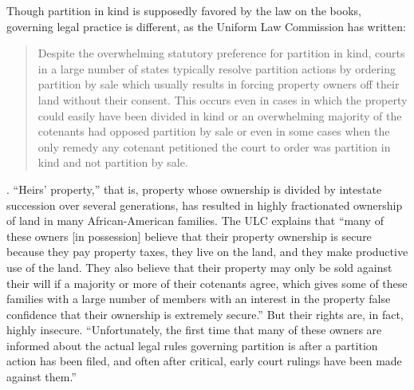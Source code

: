 
Though partition in kind is supposedly favored by the law on the books,
governing legal practice is different, as the Uniform Law Commission has
written:
\begin{quote}
Despite the overwhelming statutory preference for partition in kind, courts in a
large number of states typically resolve partition actions by ordering
partition by sale which usually results in forcing property owners off their
land without their consent. This occurs even in cases in which the property
could easily have been divided in kind or an overwhelming majority of the
cotenants had opposed partition by sale or even in some cases when the only
remedy any cotenant petitioned the court to order was partition in kind and not
partition by sale.
\end{quote}
.
``Heirs'
property,'' that is, property whose ownership is divided by intestate
succession over several generations, has resulted in highly fractionated
ownership of land in many African-American families. The ULC explains that
``many of these owners [in possession] believe that their property ownership is
secure because they pay property taxes, they live on the land, and they make
productive use of the land. They also believe that their property may only be
sold against their will if a majority or more of their cotenants agree, which
gives some of these families with a large number of members with an interest in
the property false confidence that their ownership is extremely secure.'' But
their rights are, in fact, highly insecure. ``Unfortunately, the first time
that many of these owners are informed about the actual legal rules governing
partition is after a partition action has been filed, and often after critical,
early court rulings have been made against them.''


